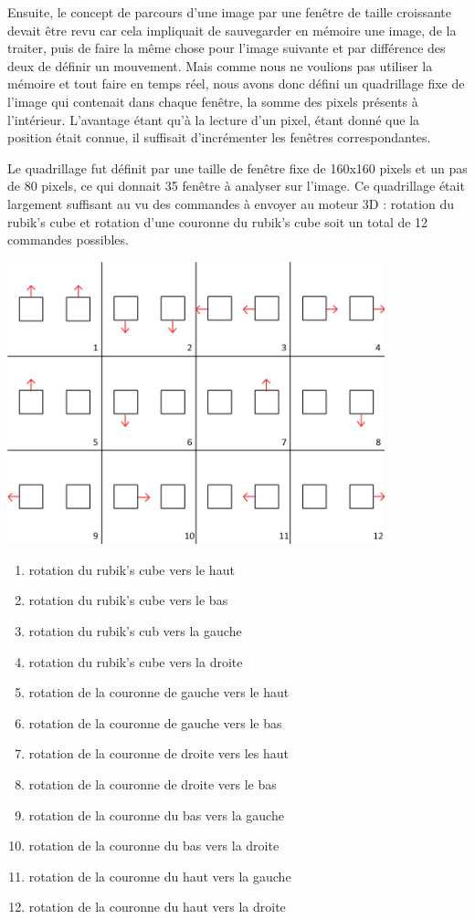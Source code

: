 \documentclass[10pt,a4paper]{report}
\begin{document}
Ensuite, le concept de parcours d'une image par une fenêtre de taille croissante devait être revu car cela impliquait de sauvegarder en mémoire une image, de la traiter, puis de faire la même chose pour l'image suivante et par différence des deux de définir un mouvement. Mais comme nous ne voulions pas utiliser la mémoire et tout faire en temps réel, nous avons donc défini un quadrillage fixe de l'image qui contenait dans chaque fenêtre, la somme des pixels présents à l'intérieur. L'avantage étant qu'à la lecture d'un pixel, étant donné que la position était connue, il suffisait d'incrémenter les fenêtres correspondantes.

Le quadrillage fut définit par une taille de fenêtre fixe de 160x160 pixels et un pas de 80 pixels, ce qui donnait 35 fenêtre à analyser sur l'image. Ce quadrillage était largement suffisant au vu des commandes à envoyer au moteur 3D : rotation du rubik's cube et rotation d'une couronne du rubik's cube soit un total de 12 commandes possibles.

\begin{center}
\includegraphics[width=310pt]{gfx/schema_motion_sensing.png}
\end{center}

\begin{enumerate}
\item rotation du rubik's cube vers le haut
\item rotation du rubik's cube vers le bas
\item rotation du rubik's cub vers la gauche
\item rotation du rubik's cube vers la droite
\item rotation de la couronne de gauche vers le haut
\item rotation de la couronne de gauche vers le bas
\item rotation de la couronne de droite vers les haut
\item rotation de la couronne de droite vers le bas
\item rotation de la couronne du bas vers la gauche
\item rotation de la couronne du bas vers la droite
\item rotation de la couronne du haut vers la gauche
\item rotation de la couronne du haut vers la droite\\
\end{enumerate}
\end{document}
